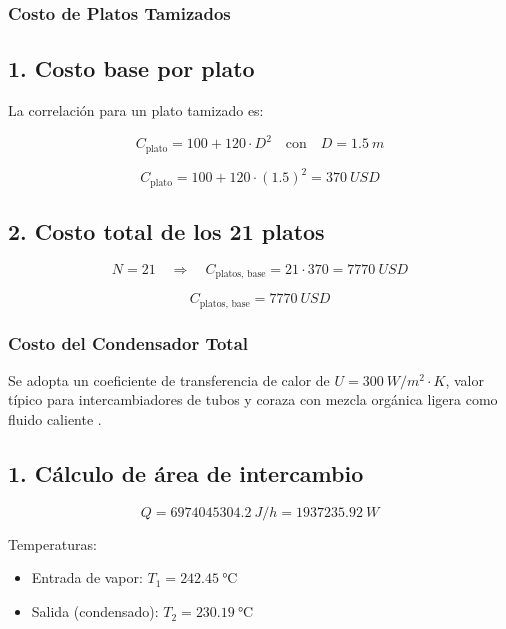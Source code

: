 \bigskip

\subsubsection{Costo de Platos Tamizados}

\subsection*{1. Costo base por plato}

La correlación para un plato tamizado es:

\[
    C_{\text{plato}} = 100 + 120 \cdot D^{2}
    \quad\text{con}\quad D = \SI{1.5}{m}
\]

\[
    C_{\text{plato}} = 100 + 120 \cdot (1.5)^2 = \SI{370}{USD}
\]

\subsection*{2. Costo total de los 21 platos}

\[
    N = 21
    \quad\Rightarrow\quad
    C_{\text{platos, base}} = 21 \cdot 370 = \SI{7770}{USD}
\]

\[
    \boxed{C_{\text{platos, base}} = \SI{7770}{USD}}
\]

\bigskip

\subsubsection{Costo del Condensador Total}

Se adopta un coeficiente de transferencia de calor de \( U = \SI{300}{W/m^2 \cdot K} \), valor típico para intercambiadores de tubos y coraza con mezcla orgánica ligera como fluido caliente \parencite[p.~797]{towler2013chemical}.

\subsection*{1. Cálculo de área de intercambio}

\[
    Q = \SI{6974045304.2}{J/h} = \SI{1937235.92}{W}
\]

Temperaturas:

\begin{itemize}
    \item Entrada de vapor: \( T_1 = \SI{242.45}{\celsius} \)
    \item Salida (condensado): \( T_2 = \SI{230.19}{\celsius} \)
\end{itemize}

